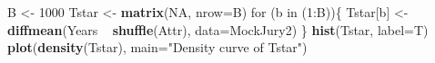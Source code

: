 \documentclass[]{book}
\newenvironment{Shaded}{\begin{snugshade}}{\end{snugshade}}
\newcommand{\KeywordTok}[1]{\textcolor[rgb]{0.13,0.29,0.53}{\textbf{{#1}}}}
\newcommand{\DataTypeTok}[1]{\textcolor[rgb]{0.13,0.29,0.53}{{#1}}}
\newcommand{\DecValTok}[1]{\textcolor[rgb]{0.00,0.00,0.81}{{#1}}}
\newcommand{\StringTok}[1]{\textcolor[rgb]{0.31,0.60,0.02}{{#1}}}
\newcommand{\OtherTok}[1]{\textcolor[rgb]{0.56,0.35,0.01}{{#1}}}
\newcommand{\NormalTok}[1]{{#1}}
\begin{document}
\begin{Shaded}
\begin{Highlighting}[]
\NormalTok{B <-}\StringTok{ }\DecValTok{1000}
\NormalTok{Tstar <-}\StringTok{ }\KeywordTok{matrix}\NormalTok{(}\OtherTok{NA}\NormalTok{, }\DataTypeTok{nrow=}\NormalTok{B)}
\NormalTok{for (b in (}\DecValTok{1}\NormalTok{:B))\{}
  \NormalTok{Tstar[b] <-}\StringTok{ }\KeywordTok{diffmean}\NormalTok{(Years ~}\StringTok{ }\KeywordTok{shuffle}\NormalTok{(Attr), }\DataTypeTok{data=}\NormalTok{MockJury2)}
\NormalTok{\}}
\KeywordTok{hist}\NormalTok{(Tstar, }\DataTypeTok{label=}\NormalTok{T)}
\KeywordTok{plot}\NormalTok{(}\KeywordTok{density}\NormalTok{(Tstar), }\DataTypeTok{main=}\StringTok{"Density curve of Tstar"}\NormalTok{)}
\end{Highlighting}
\end{Shaded}
\end{document}
